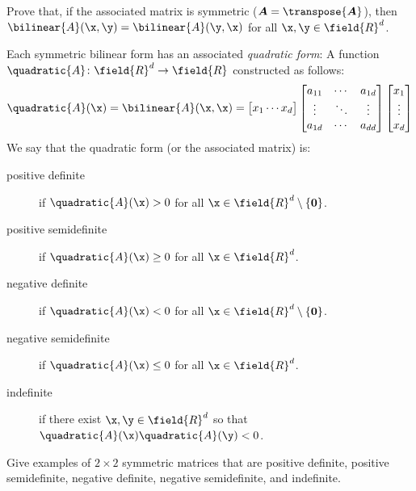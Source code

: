 \begin{problem}\label{problem:BilinearForm}
Prove that, if the associated matrix is symmetric ($\boldsymbol{A} = \transpose{\boldsymbol{A}}$), then $\bilinear{A}(\x,\y) = \bilinear{A}(\y,\x)$ for all $\x, \y \in \field{R}^d$.
\end{problem}

\begin{example}\label{example:QuadraticForm}
Each symmetric bilinear form has an associated \emph{quadratic form}: A function $\quadratic{A} \colon \field{R}^d \to \field{R}$ constructed as follows:
\begin{equation*}
\quadratic{A}(\x) = \bilinear{A}(\x,\x) = \begin{bmatrix} x_1 \dotsb x_d \end{bmatrix} \begin{bmatrix} a_{11} &\dotsb &a_{1d} \\ \vdots & \ddots & \vdots \\ a_{1d} &\dotsb &a_{dd} \end{bmatrix} \begin{bmatrix} x_1 \\ \vdots \\ x_d \end{bmatrix}
\end{equation*}
We say that the quadratic form (or the associated matrix) is:
\begin{description}
\item[positive definite] if $\quadratic{A}(\x) > 0$ for all $\x \in \field{R}^d \setminus \{ \boldsymbol{0} \}$.
\item[positive semidefinite] if $\quadratic{A}(\x)\geq 0$ for all $\x \in \field{R}^d$.
\item[negative definite] if $\quadratic{A}(\x) < 0$ for all $\x \in \field{R}^d \setminus \{ \boldsymbol{0} \}$.
\item[negative semidefinite] if $\quadratic{A}(\x) \leq 0$ for all $\x \in \field{R}^d$.
\item[indefinite] if there exist $\x, \y \in \field{R}^d$ so that $\quadratic{A}(\x) \quadratic{A}(\y) < 0$. 
\end{description}
\end{example}

\begin{problem}
Give examples of $2 \times 2$ symmetric matrices that are positive definite, positive semidefinite, negative definite, negative semidefinite, and indefinite.
\end{problem}

